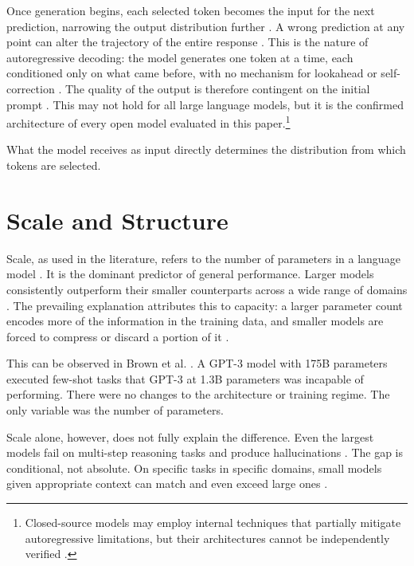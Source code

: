 \documentclass[master]{thesis}
\begin{document}
Once generation begins, each selected token becomes the input for the next prediction, narrowing the output distribution further \cite{brown2020gpt3}. A wrong prediction at any point can alter the trajectory of the entire response \cite{exposure_bias_ilp2022, lpsr2026}. This is the nature of autoregressive decoding: the model generates one token at a time, each conditioned only on what came before, with no mechanism for lookahead or self-correction \cite{brown2020gpt3, exposure_bias_ilp2022}. The quality of the output is therefore contingent on the initial prompt \cite{prompt_control_theory2023}. This may not hold for all large language models, but it is the confirmed architecture of every open model evaluated in this paper.\footnote{Closed-source models may employ internal techniques that partially mitigate autoregressive limitations, but their architectures cannot be independently verified \cite{liesenfeld2024closed}.}

What the model receives as input directly determines the distribution from which tokens are selected.

\section{Scale and Structure}
\label{sec:scale}

Scale, as used in the literature, refers to the number of parameters in a language model \cite{kaplan2020scaling}. It is the dominant predictor of general performance. Larger models consistently outperform their smaller counterparts across a wide range of domains \cite{kaplan2020scaling, hoffmann2022chinchilla}. The prevailing explanation attributes this to capacity: a larger parameter count encodes more of the information in the training data, and smaller models are forced to compress or discard a portion of it \cite{llmoverview2023, knowledgecapacity2024}.

This can be observed in Brown et al. \cite{brown2020gpt3}. A GPT-3 model with 175B parameters executed few-shot tasks that GPT-3 at 1.3B parameters was incapable of performing. There were no changes to the architecture or training regime. The only variable was the number of parameters.

Scale alone, however, does not fully explain the difference. Even the largest models fail on multi-step reasoning tasks and produce hallucinations \cite{math_reasoning_limits2024, lrm_complexity2025}. The gap is conditional, not absolute. On specific tasks in specific domains, small models given appropriate context can match and even exceed large ones \cite{smalllmsready2024, modelsizematters2024}.
\end{document}
